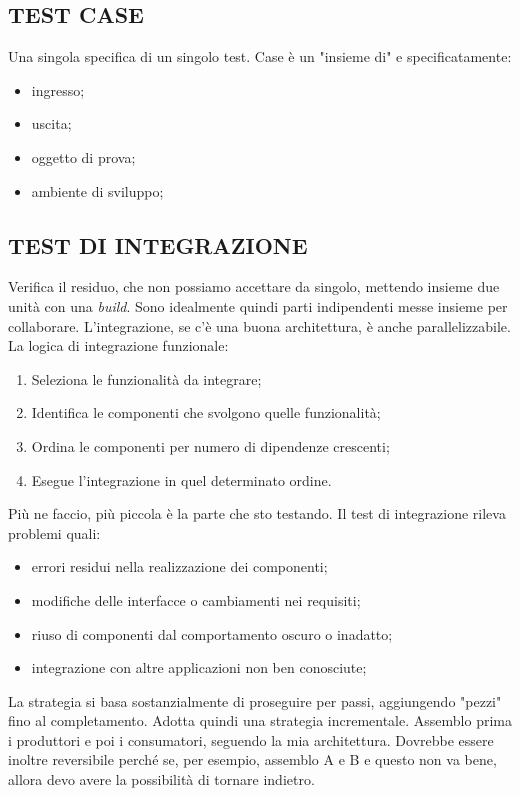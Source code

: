 		
		\subsection{TEST CASE}		\label{testcase}
		Una singola specifica di un singolo test. Case è un "insieme di" e specificatamente:
		\begin{itemize}
			\item ingresso;
			\item uscita;
			\item oggetto di prova;
			\item ambiente di sviluppo;
		\end{itemize}
	
		
		\subsection{TEST DI INTEGRAZIONE}	 \label{testintegrazione}
		Verifica il residuo, che non possiamo accettare da singolo, mettendo insieme due unità con una \textit{build}. Sono idealmente quindi parti indipendenti messe insieme per collaborare. L'integrazione, se c'è una buona architettura, è anche parallelizzabile. \\
		La logica di integrazione funzionale:
		\begin{enumerate}
			\item Seleziona le funzionalità da integrare;
			\item Identifica le componenti che svolgono quelle funzionalità;
			\item Ordina le componenti per numero di dipendenze crescenti;
			\item Esegue l'integrazione in quel determinato ordine.
		\end{enumerate}
		Più ne faccio, più piccola è la parte che sto testando. Il test di integrazione rileva problemi quali:
		\begin{itemize}
			\item errori residui nella realizzazione dei componenti;
			\item modifiche delle interfacce o cambiamenti nei requisiti;
			\item riuso di componenti dal comportamento oscuro o inadatto;
			\item integrazione con altre applicazioni non ben conosciute;
		\end{itemize}
		La strategia si basa sostanzialmente di proseguire per passi, aggiungendo "pezzi" fino al completamento. Adotta quindi una strategia incrementale. Assemblo prima i produttori e poi i consumatori, seguendo la mia architettura. Dovrebbe essere inoltre reversibile perché se, per esempio, assemblo A e B e questo non va bene, allora devo avere la possibilità di tornare indietro.
